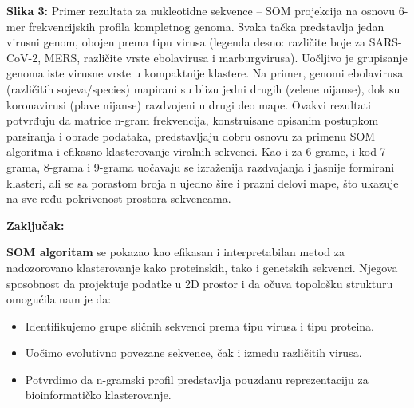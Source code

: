 \documentclass[a4paper,12pt]{article}
\begin{document}
\textbf{Slika 3:} Primer rezultata za nukleotidne sekvence – SOM projekcija na osnovu 6-mer frekvencijskih profila
kompletnog genoma. Svaka tačka predstavlja jedan virusni genom, obojen prema tipu virusa (legenda
desno: različite boje za SARS-CoV-2, MERS, različite vrste ebolavirusa i marburgvirusa). Uočljivo je grupisanje
genoma iste virusne vrste u kompaktnije klastere. Na primer, genomi ebolavirusa (različitih sojeva/species)
mapirani su blizu jedni drugih (zelene nijanse), dok su koronavirusi (plave nijanse) razdvojeni u drugi deo
mape. Ovakvi rezultati potvrđuju da matrice n-gram frekvencija, konstruisane opisanim postupkom
parsiranja i obrade podataka, predstavljaju dobru osnovu za primenu SOM algoritma i efikasno
klasterovanje viralnih sekvenci. Kao i za 6-grame, i kod 7-grama, 8-grama i 9-grama uočavaju se izraženija razdvajanja i jasnije formirani klasteri, ali se sa porastom broja n ujedno šire i prazni delovi mape, što ukazuje na sve ređu pokrivenost prostora sekvencama.

\vspace{200pt}
\textbf{Zaključak:}

\vspace{10pt}
\textbf{SOM algoritam} se pokazao kao efikasan i interpretabilan metod za nadozorovano klasterovanje kako proteinskih, tako i genetskih sekvenci. Njegova sposobnost da projektuje podatke u 2D prostor i da očuva topološku strukturu omogućila nam je da:

\begin{itemize}
    \item Identifikujemo grupe sličnih sekvenci prema tipu virusa i tipu proteina.
    \item Uočimo evolutivno povezane sekvence, čak i između različitih virusa.
    \item Potvrdimo da n-gramski profil predstavlja pouzdanu reprezentaciju za bioinformatičko klasterovanje.
\end{itemize}

\newpage

    
\end{document}
